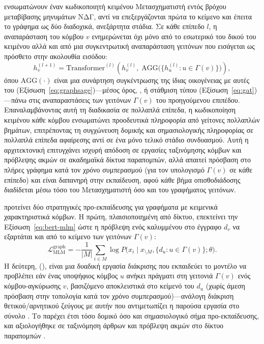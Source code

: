 \textbf{} \cite{yang2021graphformers} ενσωματώνουν έναν κωδικοποιητή
κειμένου Μετασχηματιστή εντός βρόχου μεταβίβασης μηνυμάτων ΝΔΓ, αντί να
επεξεργάζονται πρώτα το κείμενο και έπειτα το γράφημα ως δύο διαδοχικά, ανεξάρτητα
στάδια.
Σε κάθε επίπεδο $l$, η αναπαράσταση  του κόμβου $v$ ενημερώνεται
όχι μόνο από το εσωτερικό  του δικού του κειμένου αλλά και
από μια συγκεντρωτική αναπαράσταση γειτόνων που εισάγεται ως πρόσθετο
 \en{[GNN]} στην ακολουθία εισόδου:
\begin{equation}
    h_v^{(l+1)} = \mathrm{Transformer}^{(l)}\!\left(h_v^{(l)}, \; \mathrm{AGG}\bigl(\{h_u^{(l)} : u \in \Gamma(v)\}\bigr)\right),
    \label{eq:graphformers-update}
\end{equation}
όπου $\mathrm{AGG}(\cdot)$ είναι μια συνάρτηση συγκέντρωσης της ίδιας οικογένειας με
αυτές του  (Εξίσωση~\ref{eq:graphsage})---μέσος όρος, ,
ή στάθμιση τύπου  (Εξίσωση~\ref{eq:gat})---πάνω στις αναπαραστάσεις των
γειτόνων $\Gamma(v)$ του προηγούμενου επιπέδου.
Επαναλαμβάνοντας αυτή τη διαδικασία σε πολλαπλά επίπεδα, η κωδικοποίηση
κειμένου κάθε κόμβου ενσωματώνει προοδευτικά πληροφορία από γείτονες πολλαπλών
βημάτων, επιτρέποντας τη συγχώνευση δομικής και σημασιολογικής πληροφορίας σε
πολλαπλά επίπεδα αφαίρεσης αντί σε ένα μόνο τελικό στάδιο συνδυασμού.
Αυτή η αρχιτεκτονική επιτυγχάνει ισχυρή απόδοση σε εργασίες ταξινόμησης κόμβων
και πρόβλεψης ακμών σε ακαδημαϊκά δίκτυα παραπομπών, αλλά απαιτεί πρόσβαση στο
πλήρες γράφημα κατά τον χρόνο συμπερασμού (για τον υπολογισμό $\Gamma(v)$ σε κάθε
επίπεδο) και είναι δαπανηρή στην εκπαίδευση, αφού κάθε βήμα οπισθοδιάδοσης
διαδίδεται μέσω τόσο του Μετασχηματιστή όσο και του γραφήματος γειτόνων.

\textbf{} \cite{jin2023patton} προτείνει δύο στρατηγικές προ-εκπαίδευσης για
γραφήματα με κειμενικά χαρακτηριστικά κόμβων.
Η πρώτη, 
πλαισιοποιημένη από δίκτυο, επεκτείνει την Εξίσωση~\ref{eq:bert-mlm} ώστε η
πρόβλεψη ενός καλυμμένου  στο έγγραφο $d_v$ να εξαρτάται και από το
κείμενο των γειτόνων $\Gamma(v)$:
\begin{equation}
    \mathcal{L}_{\mathrm{MLM}}^{\mathrm{graph}} = -\frac{1}{|M|} \sum_{i \in M} \log P\bigl(x_i \mid x_{\setminus M}, \{d_u : u \in \Gamma(v)\}; \theta\bigr).
    \label{eq:patton-mlm}
\end{equation}
Η δεύτερη,  (), είναι μια
δυαδική εργασία διάκρισης που εκπαιδεύει το μοντέλο να προβλέπει εάν ένας υποψήφιος
κόμβος $u$ ανήκει πράγματι στη γειτονιά $\Gamma(v)$ ενός κόμβου-αγκύρωσης $v$,
βασιζόμενο αποκλειστικά στο κείμενό του $d_u$ (χωρίς άμεση πρόσβαση στην τοπολογία
κατά τον χρόνο συμπερασμού)---ανάλογη διάκριση θετικού/αρνητικού ζεύγους με αυτήν
που αντιμετωπίζει η παρούσα εργασία στο σύνολο .
Το  παρέχει έτσι τόσο δομικό όσο και σημασιολογικό σήμα
προ-εκπαίδευσης, και αξιολογήθηκε σε ταξινόμηση άρθρων και πρόβλεψη ακμών στο
δίκτυο παραπομπών .

